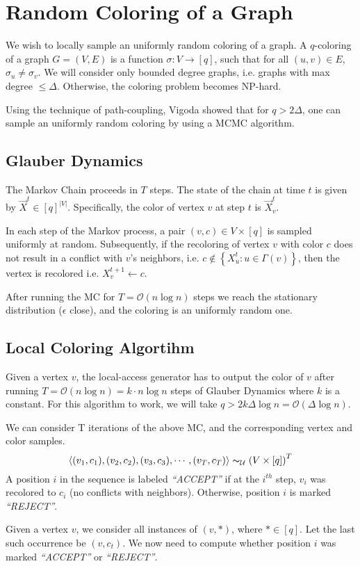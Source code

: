 \section{Random Coloring of a Graph}%
\label{sec:random_coloring_of_a_graph}

We wish to locally sample an uniformly random coloring of a graph.
A $q$-coloring of a graph $G = (V, E)$ is a function $\sigma : V\rightarrow [q]$,
such that for all $(u,v)\in E$, $\sigma_u \not= \sigma_v$.
We will consider only bounded degree graphs, i.e. graphs with max degree $\le \Delta$.
Otherwise, the coloring problem becomes NP-hard.

Using the technique of path-coupling, Vigoda  showed that for $q > 2\Delta$,
one can sample an uniformly random coloring by using a MCMC algorithm.

\subsection{Glauber Dynamics}%
\label{sub:glauber_dynamics}

The Markov Chain proceeds in $T$ steps. The state of the chain at time $t$ is given by $\vec X^t\in [q]^{|V|}$.
Specifically, the color of vertex $v$ at step $t$ is $\vec X^t_v$.

In each step of the Markov process, a pair $(v, c)\in V\times [q]$ is sampled uniformly at random.
Subsequently, if the recoloring of vertex $v$ with color $c$ does not result in a conflict with $v$'s neighbors,
i.e. $c\not\in \left\{ X^t_u : u\in \Gamma(v)\right\}$, then the vertex is recolored i.e. $X_v^{t+1}\leftarrow c$.

After running the MC for $T = \mathcal{O}(n\log n)$ steps we reach the stationary distribution ($\epsilon$ close),
and the coloring is an uniformly random one.

\subsection{Local Coloring Algortihm}%
\label{sub:local_coloring_algortihm}

Given a vertex $v$, the local-access generator has to output the color of $v$
after running $T = \mathcal{O}(n\log n) = k\cdot n\log n$ steps of Glauber Dynamics where $k$ is a constant.
For this algorithm to work, we will take $q > 2k\Delta\log n = \mathcal{O}(\Delta\log n)$.

We can consider T iterations of the above MC, and the corresponding vertex and color samples.
\[
\left\langle (v_1, c_1), (v_2, c_2), (v_3, c_3), \cdots, (v_T, c_T)\right\rangle
\thicksim_{\mathcal U} \left( V\times [q]\right)^T
\]
A position $i$ in the sequence is labeled \emph{``ACCEPT''} if at the $i^{th}$ step,
$v_i$ was recolored to $c_i$ (no conflicts with neighbors).
Otherwise, position $i$ is marked \emph{``REJECT''}.

Given a vertex $v$, we consider all instances of $(v, *)$, where $*\in [q]$.
Let the last such occurrence be $(v, c_t)$.
We now need to compute whether position $i$ was marked \emph{``ACCEPT''} or \emph{``REJECT''}.


